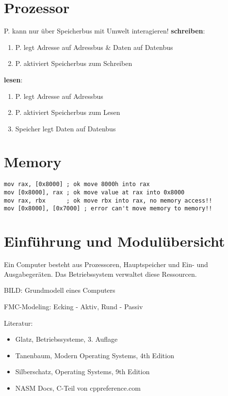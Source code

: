 

\newcommand{\TITLE}{Betriebssysteme 1}
\newcommand{\AUTHOR}{Mona Panchaud}
\newcommand{\INSTITUTE}{Ostschweizer Fachhochschule}

\begin{multicols*}{4}

\section{Prozessor}
P. kann nur über Speicherbus mit Umwelt interagieren!
\textbf{schreiben}:
\begin{enumerate}
    \item P. legt Adresse auf Adressbus \& Daten auf Datenbus
    \item P. aktiviert Speicherbus zum Schreiben
\end{enumerate}
\textbf{lesen}:
\begin{enumerate}
    \item P. legt Adresse auf Adressbus
    \item P. aktiviert Speicherbus zum Lesen
    \item Speicher legt Daten auf Datenbus
\end{enumerate}

\section{Memory}

\begin{lstlisting}[language={[x86masm]Assembler}]
mov rax, [0x8000] ; ok move 8000h into rax
mov [0x8000], rax ; ok move value at rax into 0x8000
mov rax, rbx      ; ok move rbx into rax, no memory access!!
mov [0x8000], [0x7000] ; error can't move memory to memory!!
\end{lstlisting}

\section{Einführung und Modulübersicht}
Ein Computer besteht aus Prozessoren, Hauptspeicher und Ein- und Ausgabegeräten. Das Betriebssystem verwaltet diese Ressourcen.

BILD: Grundmodell eines Computers

FMC-Modeling: Ecking - Aktiv, Rund - Passiv

Literatur:
\begin{itemize}
    \item Glatz, Betriebssysteme, 3. Auflage
    \item Tanenbaum, Modern Operating Systems, 4th Edition
    \item Silberschatz, Operating Systems, 9th Edition
    \item NASM Docs, C-Teil von cppreference.com
\end{itemize}


\end{multicols*}
